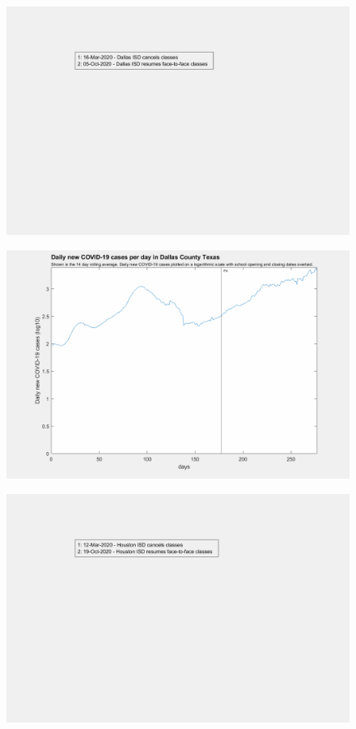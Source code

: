 \documentclass[]{article}
\begin{document}
\begin{figure}[!h]
	\includegraphics[width=\linewidth]{legends/dallas_school_legend.png}
	\caption{}
	\label{fig:legends/dallas_school_legendLabel}
\end{figure}

\begin{figure}[!h]
	\includegraphics[width=\linewidth]{images/dallas_cases_school_log.png}
	\caption{}
	\label{fig:images/dallas_cases_school_logLabel}
\end{figure}

\begin{figure}[!h]
	\includegraphics[width=\linewidth]{legends/harris_school_legend.png}
	\caption{}
	\label{fig:legends/harris_school_legendLabel}
\end{figure}
\end{document}
